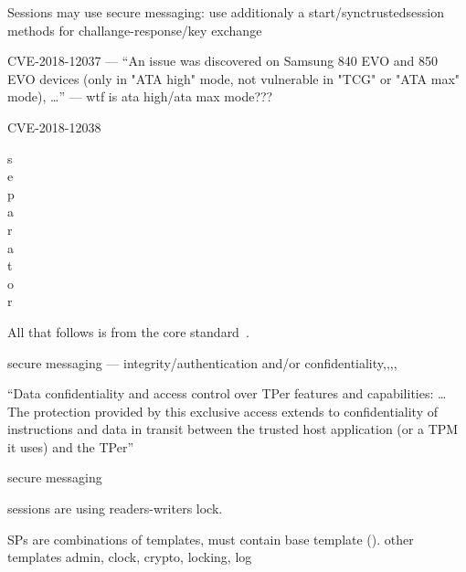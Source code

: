 Sessions may use secure messaging: 
use additionaly a start/synctrustedsession methods for challange-response/key exchange

CVE-2018-12037  --- ``An issue was discovered on Samsung 840 EVO and 850 EVO devices (only in "ATA high" mode, not vulnerable in "TCG" or "ATA max" mode), \dots'' --- wtf is ata high/ata max mode???

CVE-2018-12038


s \\
e \\
p \\
a \\
r \\
a \\
t \\
o \\
r \\


\newpage

All that follows is from the core standard~\cite{tcg-storage-core}.





secure messaging --- integrity/authentication and/or confidentiality,,,,





``Data confidentiality and access control over TPer features and capabilities: \dots The protection provided by this
exclusive access extends to confidentiality of instructions and data in transit between the
trusted host application (or a TPM it uses) and the TPer''


secure messaging

sessions are using readers-writers lock.

SPs are combinations of templates, must contain base template (). other templates admin, clock, crypto, locking, log

